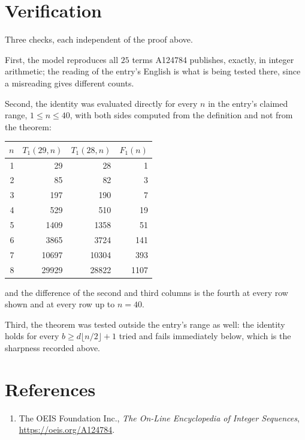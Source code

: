 \documentclass[11pt,a4paper]{article}
\theoremstyle{plain}
\theoremstyle{definition}
\begin{document}
\section{Verification}

Three checks, each independent of the proof above.

First, the model reproduces all $25$ terms A124784 publishes, exactly, in integer
arithmetic; the reading of the entry's English is what is being tested there, since a
misreading gives different counts.

Second, the identity was evaluated directly for every $n$ in the entry's claimed range,
$1\le n\le40$, with both sides computed from the definition and not from the theorem:

\begin{center}
\begin{tabular}{rrrr}
$n$ & $T_{1}(29,n)$ & $T_{1}(28,n)$ & $F_{1}(n)$ \\ \hline
1 & 29 & 28 & 1 \\
2 & 85 & 82 & 3 \\
3 & 197 & 190 & 7 \\
4 & 529 & 510 & 19 \\
5 & 1409 & 1358 & 51 \\
6 & 3865 & 3724 & 141 \\
7 & 10697 & 10304 & 393 \\
8 & 29929 & 28822 & 1107 \\
\end{tabular}
\end{center}

\noindent and the difference of the second and third columns is the fourth at every row shown
and at every row up to $n=40$.

Third, the theorem was tested outside the entry's range as well: the identity holds for every
$b\ge d\lfloor n/2\rfloor+1$ tried and fails immediately below, which is the sharpness recorded
above.

\section*{References}
\begin{enumerate}
\item The OEIS Foundation Inc., \emph{The On-Line Encyclopedia of Integer Sequences},
\url{https://oeis.org/A124784}.
\end{enumerate}
\end{document}
